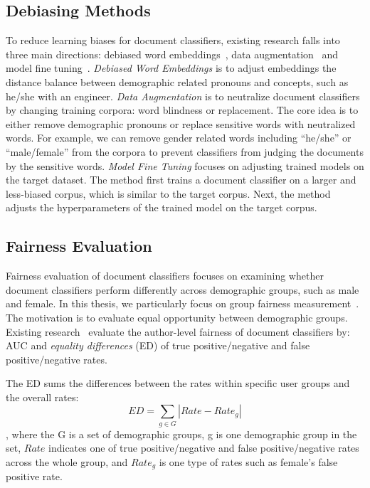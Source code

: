 \subsection{Debiasing Methods}

To reduce learning biases for document classifiers, existing research falls into three main directions: debiased word embeddings~\cite{zhao2017men}, data augmentation~\cite{dixon2018measuring, zhao2019gender} and model fine tuning~\cite{park2018reducing}.
\textit{Debiased Word Embeddings} is to adjust embeddings the distance balance between demographic related pronouns and concepts, such as he/she with an engineer.
\textit{Data Augmentation} is to neutralize document classifiers by changing training corpora: word blindness or replacement. 
The core idea is to either remove demographic pronouns or replace sensitive words with neutralized words.
For example, we can remove gender related words including  ``he/she'' or ``male/female'' from the corpora to prevent classifiers from judging the documents by the sensitive words.
\textit{Model Fine Tuning} focuses on adjusting trained models on the target dataset. The method first trains a document classifier on a larger and less-biased corpus, which is similar to the target corpus. 
Next, the method adjusts the hyperparameters of the trained model on the target corpus.


\subsection{Fairness Evaluation}

Fairness evaluation of document classifiers focuses on examining whether document classifiers perform differently across demographic groups, such as male and female.
In this thesis, we particularly focus on group fairness measurement~\cite{hardt2016equality}. 
The motivation is to evaluate equal opportunity between demographic groups.
Existing research~\cite{dixon2018measuring, garg2019counterfactual, park2018reducing} evaluate the author-level fairness of document classifiers by: AUC and \textit{equality differences} (ED) of true positive/negative and false positive/negative rates.

The ED sums the differences between the rates within specific user groups and the overall rates:
$$ED = \sum_{g \in G}|Rate - Rate_g|$$
, where the G is a set of demographic groups, g is one demographic group in the set, $Rate$ indicates one of true positive/negative and false positive/negative rates across the whole group, and $Rate_g$ is one type of rates such as female's false positive rate.
